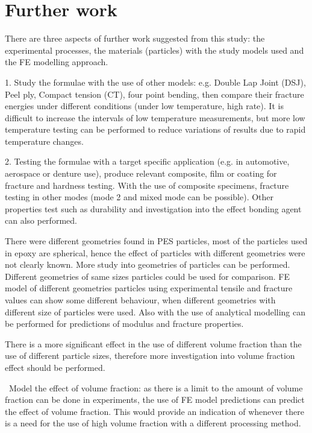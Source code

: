 \documentclass[numbers=noendperiod,chapterprefix=on]{icldt} %
\begin{document}
\chapter{Further work} \label{Further_work}
There are three aspects of further work suggested from this study: the experimental processes, the materials (particles) with the study models used and the FE modelling approach.

1. Study the formulae with the use of other models: e.g. Double Lap Joint (DSJ), Peel ply, Compact tension (CT), four point bending, then compare their fracture energies under different conditions (under low temperature, high rate). It is difficult to increase the intervals of low temperature measurements, but more low temperature testing can be performed to reduce variations of results due to rapid temperature changes. 

2. Testing the formulae with a target specific application (e.g. in automotive, aerospace or denture use), produce relevant composite, film or coating for fracture and hardness testing. With the use of composite specimens, fracture testing in other modes (mode 2 and mixed mode can be possible). Other properties test such as durability and investigation into the effect bonding agent can also performed.

There were different geometries found in PES particles, most of the particles used in epoxy are spherical, hence the effect of particles with different geometries were not clearly known. More study into geometries of particles can be performed. Different geometries of same sizes particles could be used for comparison. FE model of different geometries particles using experimental tensile and fracture values can show some different behaviour, when different geometries with different size of particles were used. Also with the use of analytical modelling can be performed for predictions of modulus and fracture properties.

There is a more significant effect in the use of different volume fraction than the use of different particle sizes, therefore more investigation into volume fraction effect should be performed. 

~Model the effect of volume fraction: as there is a limit to the amount of volume fraction can be done in experiments, the use of FE model predictions can predict the effect of volume fraction. This would provide an indication of whenever there is a need for the use of high volume fraction with a different processing method.
\end{document}
